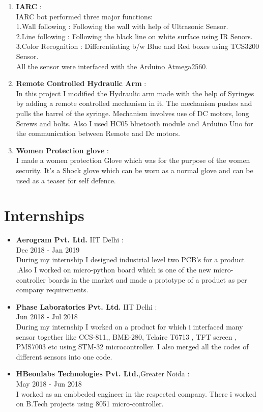 \documentclass[11pt]{article}
\begin{document}
\begin{enumerate}[label=(\arabic*)]
\item\textbf{IARC} :\\
IARC bot performed three major functions:\\
1.Wall following : Following the wall with help of Ultrasonic Sensor.\\
2.Line following : Following the black line on white surface using IR Senors.\\
3.Color Recognition :  Differentiating b/w Blue and Red boxes using TCS3200 Sensor.\\                                     
All the sensor were interfaced with the Arduino Atmega2560.

\item\textbf{Remote Controlled Hydraulic Arm} :\\
In this project I modified the Hydraulic arm made with the help of Syringes by adding a remote controlled mechanism in it. The mechanism pushes and pulls the barrel of the syringe. Mechanism involves use of DC motors, long Screws and bolts. Also I used HC05 bluetooth module and Arduino Uno for the communication between Remote and Dc motors.

\item\textbf{Women Protection glove} :\\
I made a women protection Glove which was for the purpose of the women security.
It's a Shock glove which can be worn as a normal glove and can be used as a teaser for self defence.
\end{enumerate}

\section{Internships} 
\begin{itemize}
\item\textbf{Aerogram Pvt. Ltd.} IIT Delhi :\\
Dec 2018 - Jan 2019\\
During my internship I designed industrial level two PCB's for a product .Also I worked on micro-python board which is one of the new micro-controller boards in the market and made a prototype of a product as per company requirements.
 
\item\textbf{Phase Laboratories Pvt. Ltd.} IIT Delhi :\\
Jun 2018 - Jul 2018\\
During my internship I worked on a product for which i interfaced many sensor together like CCS-811,, BME-280, Telaire T6713 , TFT screen , PMS7003 etc using STM-32 microcontroller. I also merged all the codes of different sensors into one code.

\item\textbf{HBeonlabs Technologies Pvt. Ltd.},Greater Noida :\\ 
May 2018 - Jun 2018\\
I worked as an embbeded engineer in the respected company. There i worked on B.Tech projects using 8051 micro-controller.

\end{itemize}
\end{document}
